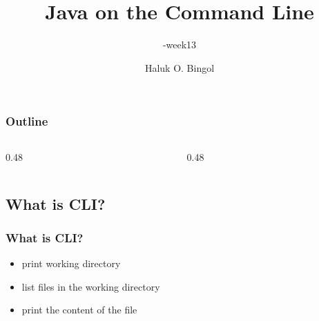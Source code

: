 \documentclass[aspectratio=169,10pt,compress]{beamer}
\title[\cisOOO-week13-CLI]{
	Java on the Command Line
}
\subtitle{
	\cisOOO-week13
}
\author[Bingol]{
	Haluk O. Bingol
}
\institute[FCIS]{
    Faculty of Computer and Information Sciences\\
    Yeditepe University
}
\date{
	{\tiny \hbTimeStamp}
}
\begin{document}




\begin{frame}[t,fragile]
  \titlepage
\end{frame}




\begin{frame}[t,fragile] \frametitle{Outline}
  \begin{columns}[T]
    \begin{column}{0.48\textwidth}
      \tableofcontents[sections={1-7}, hideallsubsections]
    \end{column}
    \begin{column}{0.48\textwidth}
      \tableofcontents[sections={8-14}, hideallsubsections]
    \end{column}
  \end{columns}
\end{frame}








\subsection[CLI]
	{What is CLI?}




\begin{frame}[t]\frametitle{What is CLI?}
	\small
	\begin{itemize}

		\item 
		 print working directory

		\item 
		 list files in the working directory

		\item 
		 print the content of the file
		
	\end{itemize}
\end{frame}
\end{document}
